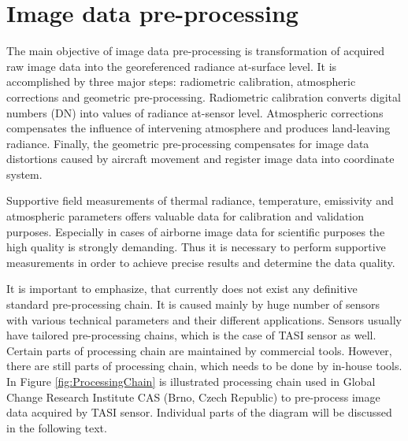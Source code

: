 \section{Image data pre-processing}

The main objective of image data pre-processing is transformation of acquired raw image data into the georeferenced radiance at-surface level. It is accomplished by three major steps: radiometric calibration, atmospheric corrections and geometric pre-processing. Radiometric calibration converts digital numbers (DN) into values of radiance at-sensor level. Atmospheric corrections compensates the influence of intervening atmosphere and produces land-leaving radiance. Finally, the geometric pre-processing compensates for image data distortions caused by aircraft movement and register image data into coordinate system.

Supportive field measurements of thermal radiance, temperature, emissivity and atmospheric parameters offers valuable data for calibration and validation purposes. Especially in cases of airborne image data for scientific purposes the high quality is strongly demanding. Thus it is necessary to perform supportive measurements in order to achieve precise results and determine the data quality.

It is important to emphasize, that currently does not exist any definitive standard pre-processing chain. It is caused mainly by huge number of sensors with various technical parameters and their different applications. Sensors usually have tailored pre-processing chains, which is the case of TASI sensor as well. Certain parts of processing chain are maintained by commercial tools. However, there are still parts of processing chain, which needs to be done by in-house tools. In Figure \ref{fig:ProcessingChain} is illustrated processing chain used in Global Change Research Institute CAS (Brno, Czech Republic) to pre-process image data acquired by TASI sensor. Individual parts of the diagram will be discussed in the following text.

